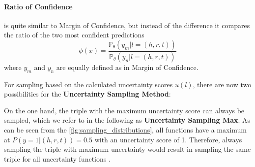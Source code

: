 \paragraph{\textbf{Ratio of Confidence}}
is quite similar to Margin of Confidence, but instead of the difference it compares the ratio of the two most confident predictions
\begin{equation}
    \phi(x) = \frac{\mathds{P}_{\theta}(y_m | l = (h,r,t))}{\mathds{P}_{\theta}(y_n | l = (h,r,t))} 
\end{equation}
where $y_m$ and $y_n$ are equally defined as in Margin of Confidence.

For sampling based on the calculated uncertainty scores $u(l)$, there are now two possibilities for the \textbf{Uncertainty Sampling Method}:

On the one hand, the triple with the maximum uncertainty score can always be sampled, which we refer to in the following as \textbf{Uncertainty Sampling Max}.
As can be seen from the \autoref{fig:sampling_distributions}, all functions have a maximum at $P(y = 1 | (h,r,t)) = 0.5$ with an uncertainty score of 1. 
Therefore, always sampling the triple with maximum uncertainty would result in sampling the same triple for all uncertainty functions \cite{nguyen2021howtomeasure, human-in-the-loop}.

